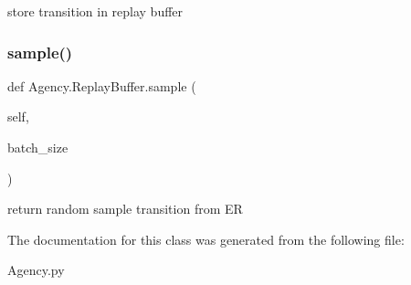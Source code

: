\begin{DoxyVerb}store transition in replay buffer \end{DoxyVerb}
 \mbox{\label{classAgency_1_1ReplayBuffer_ad4826e3b32056d091daed1120862760c}} 
\subsubsection{\texorpdfstring{sample()}{sample()}}
{\footnotesize\ttfamily def Agency.\+Replay\+Buffer.\+sample (\begin{DoxyParamCaption}\item[{}]{self,  }\item[{}]{batch\+\_\+size }\end{DoxyParamCaption})}

\begin{DoxyVerb}return random sample transition from ER \end{DoxyVerb}
 

The documentation for this class was generated from the following file\+:\begin{DoxyCompactItemize}
\item 
Agency.\+py\end{DoxyCompactItemize}
